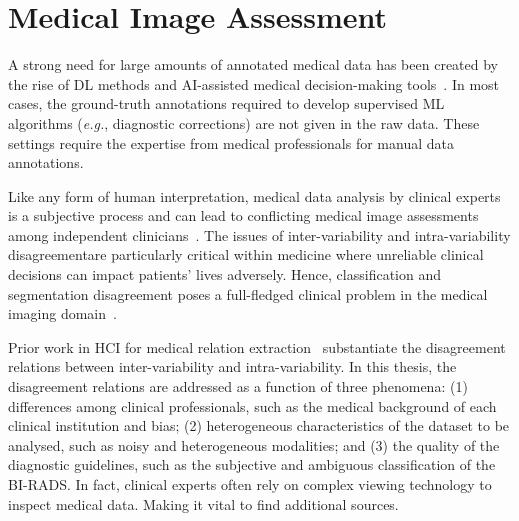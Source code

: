 \section{Medical Image Assessment}
\label{sec:chap003004}

A strong need for large amounts of annotated medical data has been created by the rise of \ac{DL} methods and \ac{AI}-assisted medical decision-making tools~\cite{10.1145/3313831.3376290}.
In most cases, the ground-truth annotations required to develop supervised \ac{ML} algorithms ({\it e.g.}, diagnostic corrections) are not given in the raw data.
These settings require the expertise from medical professionals for manual data annotations.

Like any form of human interpretation, medical data analysis by clinical experts is a subjective process and can lead to conflicting medical image assessments among independent clinicians~\cite{NIAZI2019e253, granzier2020mri, DEMCHIG201962}.
The issues of inter-variability and intra-variability disagreement\footnotemark[9] are particularly critical within medicine where unreliable clinical decisions can impact patients' lives adversely.
Hence, classification and segmentation disagreement poses a full-fledged clinical problem in the medical imaging domain~\cite{TANNO2021117366, raghu2019direct}.

Prior work in \ac{HCI} for medical relation extraction~\cite{10.1145/3152889} substantiate the disagreement relations between inter-variability and intra-variability.
In this thesis, the disagreement relations are addressed as a function of three phenomena: (1) differences among clinical professionals, such as the medical background of each clinical institution and bias; (2) heterogeneous characteristics of the dataset to be analysed, such as noisy and heterogeneous modalities; and (3) the quality of the diagnostic guidelines, such as the subjective and ambiguous classification of the \ac{BI-RADS}.
In fact, clinical experts often rely on complex viewing technology to inspect medical data.
Making it vital to find additional sources.


